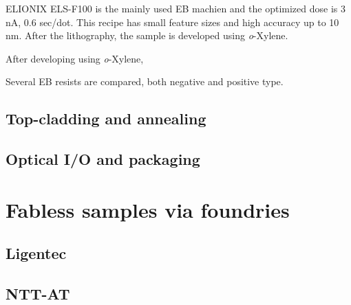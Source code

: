 ELIONIX ELS-F100 is the mainly used EB machien and the optimized dose is 3 nA, 0.6 sec/dot. This recipe has small feature sizes and high accuracy up to 10 nm. After the lithography, the sample is developed using \textit{o}-Xylene. 

After developing using \textit{o}-Xylene, 

Several EB resists are compared, both negative and positive type. 


\subsection{Top-cladding and annealing}

\subsection{Optical I/O and packaging}

\section{Fabless samples via foundries}

\subsection{Ligentec}

\subsection{NTT-AT}

